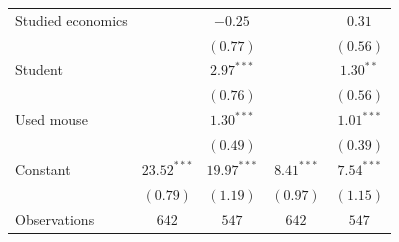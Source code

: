 \begin{tabular}{l c c c c}
Studied economics        &               & $-0.25$       &              & $0.31$        \\
                         &               & $(0.77)$      &              & $(0.56)$      \\
Student                  &               & $2.97^{***}$  &              & $1.30^{**}$   \\
                         &               & $(0.76)$      &              & $(0.56)$      \\
Used mouse               &               & $1.30^{***}$  &              & $1.01^{***}$  \\
                         &               & $(0.49)$      &              & $(0.39)$      \\
Constant                 & $23.52^{***}$ & $19.97^{***}$ & $8.41^{***}$ & $7.54^{***}$  \\
                         & $(0.79)$      & $(1.19)$      & $(0.97)$     & $(1.15)$      \\
\midrule
Observations                & $642$         & $547$         & $642$        & $547$         \\
\bottomrule
\end{tabular}
